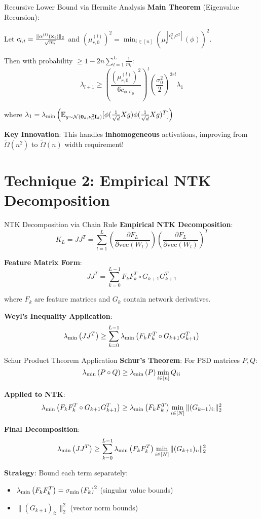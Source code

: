 \begin{frame}{Recursive Lower Bound via Hermite Analysis}
  \textbf{Main Theorem} (Eigenvalue Recursion):
  
  Let $c_{l,i} = \frac{\|\alpha^{(l)}(\mathbf{x}_i)\|_2}{\sqrt{m_l}}$ and $(\mu_{r,0}^{(l)})^2 = \min_{i \in [n]} (\mu_r^{[c_{l,i}^2 \sigma^2]}(\phi))^2$.
  
  Then with probability $\geq 1 - 2n\sum_{l=1}^L \frac{1}{m_l}$:
  $$\lambda_{l+1} \geq \left(\frac{(\mu_{r,0}^{(l)})^2}{6 c_{\phi,\sigma_0}}\right)^l \left(\frac{\sigma_0^2}{2}\right)^{3rl} \lambda_1$$
  
  where $\lambda_1 = \lambda_{\rm min}\left(\mathbb{E}_{g \sim \mathcal{N}(\boldsymbol{0}_d, \nu_0^2 \mathbf{I}_d)} [\phi(\frac{1}{\sqrt{d}} X g) \phi(\frac{1}{\sqrt{d}} X g)^T]\right)$
  
  \textbf{Key Innovation}: This handles \textbf{inhomogeneous} activations, improving from $\tilde{\Omega}(n^2)$ to $\tilde{\Omega}(n)$ width requirement!
\end{frame}

\section{Technique 2: Empirical NTK Decomposition}

\begin{frame}{NTK Decomposition via Chain Rule}
  \textbf{Empirical NTK Decomposition}:
  $$K_L = JJ^T = \sum_{l=1}^L \left(\frac{\partial F_L}{\partial \text{vec}(W_l)}\right) \left(\frac{\partial F_L}{\partial \text{vec}(W_l)}\right)^T$$
  
  \textbf{Feature Matrix Form}:
  $$JJ^T = \sum_{k=0}^{L-1} F_k F_k^T \circ G_{k+1} G_{k+1}^T$$
  
  where $F_k$ are feature matrices and $G_k$ contain network derivatives.
  
  \textbf{Weyl's Inequality Application}:
  $$\lambda_{\rm min}\left(JJ^T\right) \geq \sum_{k=0}^{L-1} \lambda_{\rm min}\left(F_k F_k^T \circ G_{k+1} G_{k+1}^T\right)$$
\end{frame}

\begin{frame}{Schur Product Theorem Application}
  \textbf{Schur's Theorem}: For PSD matrices $P, Q$:
  $$\lambda_{\rm min}\left(P \circ Q\right) \geq \lambda_{\rm min}\left(P\right) \min_{i \in [n]} Q_{ii}$$
  
  \textbf{Applied to NTK}:
  $$\lambda_{\rm min}\left(F_k F_k^T \circ G_{k+1} G_{k+1}^T\right) \geq \lambda_{\rm min}\left(F_k F_k^T\right) \min_{i \in [N]} \|(G_{k+1})_{i:}\|_2^2$$
  
  \textbf{Final Decomposition}:
  $$\lambda_{\rm min}\left(JJ^T\right) \geq \sum_{k=0}^{L-1} \lambda_{\rm min}\left(F_k F_k^T\right) \min_{i \in [N]} \|(G_{k+1})_{i:}\|_2^2$$
  
  \textbf{Strategy}: Bound each term separately:
  \begin{itemize}
    \item $\lambda_{\rm min}\left(F_k F_k^T\right) = \sigma_{\rm min}\left(F_k\right)^2$ (singular value bounds)
    \item $\|(G_{k+1})_{i:}\|_2^2$ (vector norm bounds)
  \end{itemize}
\end{frame}

